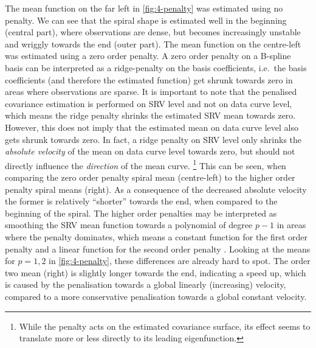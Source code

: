 The mean function on the far left in \cref{fig:4-penalty} was estimated using no penalty.
We can see that the spiral shape is estimated well in the beginning (central part), where observations are dense, but becomes increasingly unstable and wriggly towards the end (outer part).
The mean function on the centre-left was estimated using a zero order penalty.
A zero order penalty on a B-spline basis can be interpreted as a ridge-penalty on the basis coefficients, i.e.\ the basis coefficients (and therefore the estimated function) get shrunk towards zero in areas where observations are sparse.
It is important to note that the penalised covariance estimation is performed on SRV level and not on data curve level, which means the ridge penalty shrinks the estimated SRV mean towards zero.
However, this does not imply that the estimated mean on data curve level also gets shrunk towards zero.
In fact, a ridge penalty on SRV level only shrinks the \emph{absolute velocity} of the mean on data curve level towards zero, but should not directly influence the \emph{direction} of the mean curve.
\footnote{While the penalty acts on the estimated covariance surface, its effect seems to translate more or less directly to its leading eigenfunction.}
This can be seen, when comparing the zero order penalty spiral mean (centre-left) to the higher order penalty spiral means (right).
As a consequence of the decreased absolute velocity the former is relatively \enquote{shorter} towards the end, when compared to the beginning of the spiral.
The higher order penalties may be interpreted as smoothing the SRV mean function towards a polynomial of degree $p-1$ in areas where the penalty dominates, which means a constant function for the first order penalty and a linear function for the second order penalty \parencite[see e.g.][435]{FahrmeierEtAl2013}.
Looking at the means for $p = 1,2$ in \cref{fig:4-penalty}, these differences are already hard to spot.
The order two mean (right) is slightly longer towards the end, indicating a speed up, which is caused by the penalisation towards a global linearly (increasing) velocity, compared to a more conservative penalisation towards a global constant velocity. 


